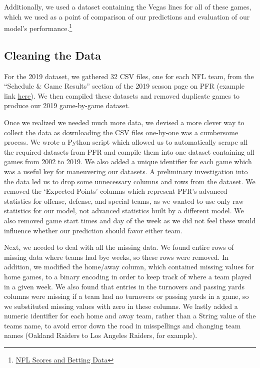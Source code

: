 \documentclass{article}
\begin{document}
\begin{multicols}{2}
Additionally, we used a dataset containing the Vegas lines for all of these games, which we used as a point of comparison of our predictions and evaluation of our model’s performance.\footnote{\href{ https://www.kaggle.com/tobycrabtree/nfl-scores-and-betting-data}{\underline{NFL Scores and Betting Data}} }

\subsection{Cleaning the Data}
For the 2019 dataset, we gathered 32 CSV files, one for each NFL team, from the “Schedule & Game Results” section of the 2019 season page on PFR (example link \href{https://www.pro-football-reference.com/teams/buf/2019.htm}{\underline{here}}). We then compiled these datasets and removed duplicate games to produce our 2019 game-by-game dataset.

Once we realized we needed much more data, we devised a more clever way to collect the data as downloading the CSV files one-by-one was a cumbersome process. We wrote a Python script which allowed us to automatically scrape all the required datasets from PFR and compile them into one dataset containing all games from 2002 to 2019. We also added a unique identifier for each game which was a useful key for maneuvering our datasets. A preliminary investigation into the data led us to drop some unnecessary columns and rows from the dataset. We removed the ‘Expected Points’ columns which represent PFR’s advanced statistics for offense, defense, and special teams, as we wanted to use only raw statistics for our model, not advanced statistics built by a different model. We also removed game start times and day of the week as we did not feel these would influence whether our prediction should favor either team. 

Next, we needed to deal with all the missing data. We found entire rows of missing data where teams had bye weeks, so these rows were removed. In addition, we modified the home/away column, which contained missing values for home games, to a binary encoding in order to keep track of where a team played in a given week. We also found that entries in the turnovers and passing yards columns were missing if a team had no turnovers or passing yards in a game, so we substituted missing values with zero in these columns. We lastly added a numeric identifier for each home and away team, rather than a String value of the teams name, to avoid error down the road in misspellings and changing team names (Oakland Raiders to Los Angeles Raiders, for example).


\end{multicols}
\end{document}
